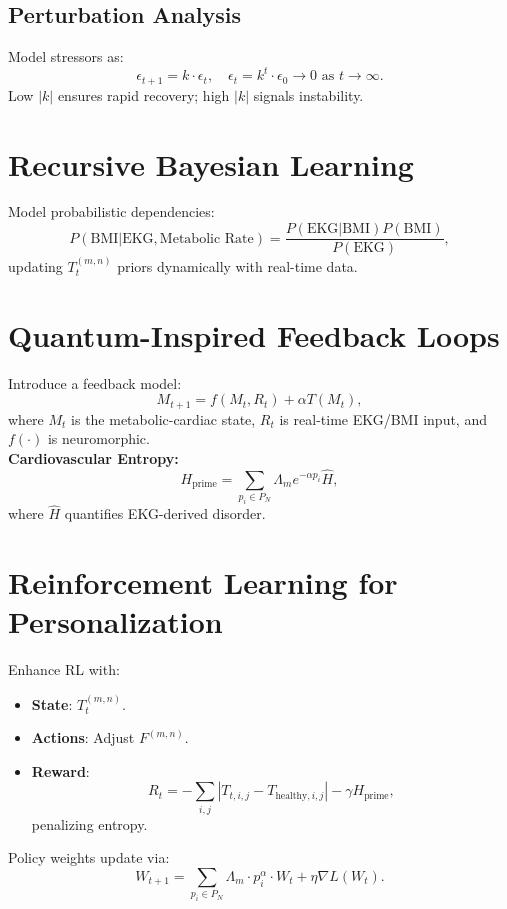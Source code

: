 \documentclass{article}
\theoremstyle{plain}
\theoremstyle{claimstyle}
\begin{document}
\subsection{Perturbation Analysis}
Model stressors as:
\begin{equation}
\epsilon_{t+1} = k \cdot \epsilon_t, \quad \epsilon_t = k^t \cdot \epsilon_0 \to 0 \text{ as } t \to \infty.
\end{equation}
Low \( |k| \) ensures rapid recovery; high \( |k| \) signals instability.

\section{Recursive Bayesian Learning}
Model probabilistic dependencies:
\begin{equation}
P(\text{BMI} | \text{EKG}, \text{Metabolic Rate}) = \frac{P(\text{EKG} | \text{BMI}) P(\text{BMI})}{P(\text{EKG})},
\end{equation}
updating \( T_t^{(m, n)} \) priors dynamically with real-time data.

\section{Quantum-Inspired Feedback Loops}
Introduce a feedback model:
\begin{equation}
M_{t+1} = f(M_t, R_t) + \alpha T(M_t),
\end{equation}
where \( M_t \) is the metabolic-cardiac state, \( R_t \) is real-time EKG/BMI input, and \( f(\cdot) \) is neuromorphic. \\
\textbf{Cardiovascular Entropy:}
\begin{equation}
H_{\text{prime}} = \sum_{p_i \in P_N} \Lambda_m e^{-\alpha p_i} \hat{H},
\end{equation}
where \( \hat{H} \) quantifies EKG-derived disorder.

\section{Reinforcement Learning for Personalization}
Enhance RL with:
\begin{itemize}
    \item \textbf{State}: \( T_t^{(m, n)} \).
    \item \textbf{Actions}: Adjust \( F^{(m, n)} \).
    \item \textbf{Reward}:
    \begin{equation}
    R_t = -\sum_{i,j} |T_{t,i,j} - T_{\text{healthy},i,j}| - \gamma H_{\text{prime}},
    \end{equation}
    penalizing entropy.
\end{itemize}
Policy weights update via:
\begin{equation}
W_{t+1} = \sum_{p_i \in P_N} \Lambda_m \cdot p_i^{\alpha} \cdot W_t + \eta \nabla L(W_t).
\end{equation}
\end{document}
